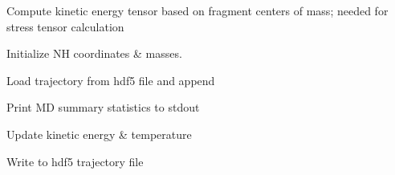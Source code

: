\documentclass[letterpaper,10pt,english]{sphinxmanual}
\begin{document}
\begin{fulllineitems}
\begin{fulllineitems}
\label{\detokenize{drivers:drivers.bim_md.Integrator.kinetic_com_tensor}}
Compute kinetic energy tensor based on fragment
centers of mass; needed for stress tensor calculation

\end{fulllineitems}


\begin{fulllineitems}
\label{\detokenize{drivers:drivers.bim_md.Integrator.nose_init}}
Initialize NH coordinates \& masses.

\end{fulllineitems}


\begin{fulllineitems}
\label{\detokenize{drivers:drivers.bim_md.Integrator.restart_trajectory_file}}
Load trajectory from hdf5 file and append

\end{fulllineitems}


\begin{fulllineitems}
\label{\detokenize{drivers:drivers.bim_md.Integrator.summary_log}}
Print MD summary statistics to stdout

\end{fulllineitems}


\begin{fulllineitems}
\label{\detokenize{drivers:drivers.bim_md.Integrator.update_kinetic_and_temperature}}
Update kinetic energy \& temperature

\end{fulllineitems}


\begin{fulllineitems}
\label{\detokenize{drivers:drivers.bim_md.Integrator.write_trajectory}}
Write to hdf5 trajectory file

\end{fulllineitems}


\end{fulllineitems}
\end{document}
